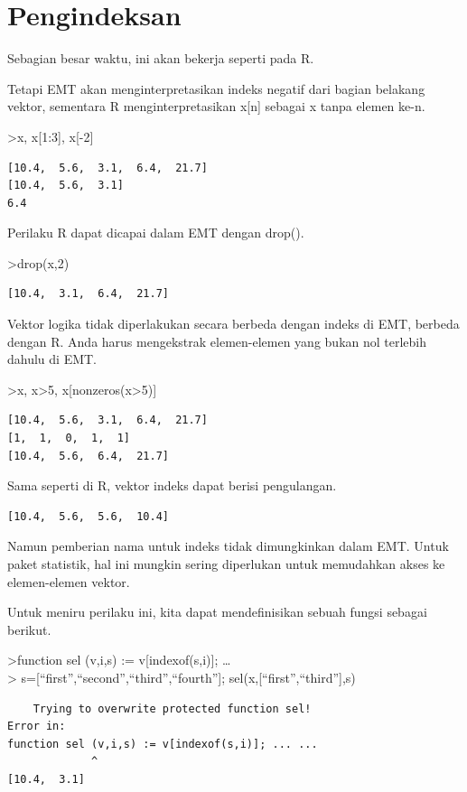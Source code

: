 \documentclass[
]{book}
\begin{document}
\section{Pengindeksan}\label{pengindeksan}

Sebagian besar waktu, ini akan bekerja seperti pada R.

Tetapi EMT akan menginterpretasikan indeks negatif dari bagian belakang vektor, sementara R menginterpretasikan x{[}n{]} sebagai x tanpa elemen ke-n.

\textgreater x, x{[}1:3{]}, x{[}-2{]}

\begin{verbatim}
[10.4,  5.6,  3.1,  6.4,  21.7]
[10.4,  5.6,  3.1]
6.4
\end{verbatim}

Perilaku R dapat dicapai dalam EMT dengan drop().

\textgreater drop(x,2)

\begin{verbatim}
[10.4,  3.1,  6.4,  21.7]
\end{verbatim}

Vektor logika tidak diperlakukan secara berbeda dengan indeks di EMT, berbeda dengan R. Anda harus mengekstrak elemen-elemen yang bukan nol terlebih dahulu di EMT.

\textgreater x, x\textgreater5, x{[}nonzeros(x\textgreater5){]}

\begin{verbatim}
[10.4,  5.6,  3.1,  6.4,  21.7]
[1,  1,  0,  1,  1]
[10.4,  5.6,  6.4,  21.7]
\end{verbatim}

Sama seperti di R, vektor indeks dapat berisi pengulangan.

\begin{verbatim}
[10.4,  5.6,  5.6,  10.4]
\end{verbatim}

Namun pemberian nama untuk indeks tidak dimungkinkan dalam EMT. Untuk paket statistik, hal ini mungkin sering diperlukan untuk memudahkan akses ke elemen-elemen vektor.

Untuk meniru perilaku ini, kita dapat mendefinisikan sebuah fungsi sebagai berikut.

\textgreater function sel (v,i,s) := v{[}indexof(s,i){]}; \ldots{}\\
\textgreater{} s={[}``first'',``second'',``third'',``fourth''{]}; sel(x,{[}``first'',``third''{]},s)

\begin{verbatim}
    Trying to overwrite protected function sel!
Error in:
function sel (v,i,s) := v[indexof(s,i)]; ... ...
             ^
[10.4,  3.1]
\end{verbatim}
\end{document}
